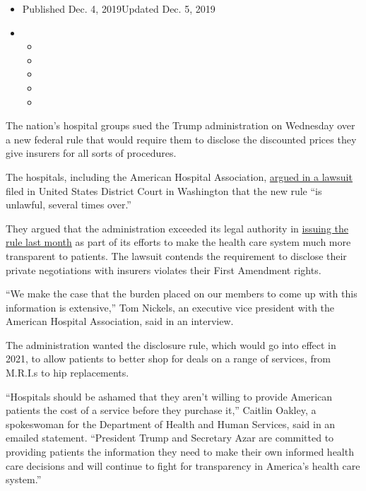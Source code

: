 \begin{itemize}
\item
  Published Dec. 4, 2019Updated Dec. 5, 2019
\item
  \begin{itemize}
  \item
  \item
  \item
  \item
  \item
  \end{itemize}
\end{itemize}

The nation's hospital groups sued the Trump administration on Wednesday
over a new federal rule that would require them to disclose the
discounted prices they give insurers for all sorts of procedures.

The hospitals, including the American Hospital Association,
\href{https://www.aha.org/system/files/media/file/2019/12/hospital-groups-lawsuit-over-illegal-rule-mandating-public-disclosure-individually-negotiated-rates-12-4-19.pdf\%20.pdf}{argued
in a lawsuit} filed in United States District Court in Washington that
the new rule ``is unlawful, several times over.''

They argued that the administration exceeded its legal authority in
\href{https://www.nytimes3xbfgragh.onion/2019/11/15/health/list-hospital-prices-trump.html}{issuing
the rule last month} as part of its efforts to make the health care
system much more transparent to patients. The lawsuit contends the
requirement to disclose their private negotiations with insurers
violates their First Amendment rights.

``We make the case that the burden placed on our members to come up with
this information is extensive,'' Tom Nickels, an executive vice
president with the American Hospital Association, said in an interview.

The administration wanted the disclosure rule, which would go into
effect in 2021, to allow patients to better shop for deals on a range of
services, from M.R.I.s to hip replacements.

``Hospitals should be ashamed that they aren't willing to provide
American patients the cost of a service before they purchase it,''
Caitlin Oakley, a spokeswoman for the Department of Health and Human
Services, said in an emailed statement. ``President Trump and Secretary
Azar are committed to providing patients the information they need to
make their own informed health care decisions and will continue to fight
for transparency in America's health care system.''

